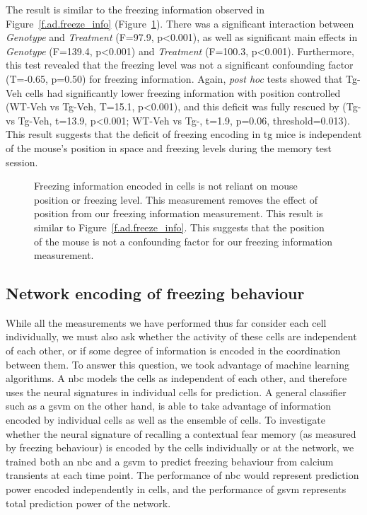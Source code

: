 The result is similar to the freezing information observed in Figure~\ref{f.ad.freeze_info} (Figure~\ref{f.ad.freeze_ctrl}). There was a significant interaction between \textit{Genotype} and \textit{Treatment} (F=97.9, p<0.001), as well as significant main effects in \textit{Genotype} (F=139.4, p<0.001) and \textit{Treatment} (F=100.3, p<0.001). Furthermore, this test revealed that the freezing level was not a significant confounding factor (T=-0.65, p=0.50) for freezing information. Again, \textit{post hoc} tests showed that Tg-Veh cells had significantly lower freezing information with position controlled (WT-Veh vs Tg-Veh, T=15.1, p<0.001), and this deficit was fully rescued by \tglu{} (Tg-\glu{} vs Tg-Veh, t=13.9, p<0.001; WT-Veh vs Tg-\glu, t=1.9, p=0.06, threshold=0.013). This result suggests that the deficit of freezing encoding in \gls{tg} mice is independent of the mouse's position in space and freezing levels during the memory test session.
\begin{figure}[h]
    
    \caption[Position-controlled freezing information.]{Freezing information encoded in cells is not reliant on mouse position or freezing level. This measurement removes the effect of position from our freezing information measurement. This result is similar to Figure~\ref{f.ad.freeze_info}. This suggests that the position of the mouse is not a confounding factor for our freezing information measurement. \label{f.ad.freeze_ctrl}}
\end{figure}



\subsection{Network encoding of freezing behaviour}

While all the measurements we have performed thus far consider each cell individually, we must also ask whether the activity of these cells are independent of each other, or if some degree of information is encoded in the coordination between them. To answer this question, we took advantage of machine learning algorithms. A \gls{nbc} models the cells as independent of each other, and therefore uses the neural signatures in individual cells for prediction. A general classifier such as a \gls{gsvm} on the other hand, is able to take advantage of information encoded by individual cells as well as the ensemble of cells. To investigate whether the neural signature of recalling a contextual fear memory (as measured by freezing behaviour) is encoded by the cells individually or at the network, we trained both an \gls{nbc} and a \gls{gsvm} to predict freezing behaviour from calcium transients at each time point. The performance of \gls{nbc} would represent prediction power encoded independently in cells, and the performance of \gls{gsvm} represents total prediction power of the network.

